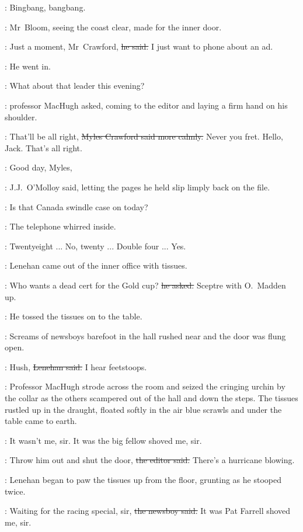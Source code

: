 \BloomInt:
Bingbang, bangbang.

:
Mr~Bloom, seeing the coast clear,
made for the inner door.

\Bloom:
Just a moment, Mr~Crawford,
\sout{he said.}
I just want to phone about an ad.

:
He went in.

\machugh:
What about that leader this evening?

:
professor MacHugh asked,
coming to the editor and laying a firm hand on his shoulder.

\crawford:
That'll be all right,
\sout{Myles Crawford said more calmly.}
Never you fret.
Hello, Jack.
That's all right.

\jjom:
Good day, Myles,

:
J.J.~O'Molloy said,
letting the pages he held slip limply back on the file.

\jjom:
Is that Canada swindle case on today?

:
The telephone whirred inside.

\Bloom:
Twentyeight ...
No, twenty ...
Double four ...
Yes.



:
Lenehan came out of the inner office with  tissues.

\lenehan:
Who wants a dead cert for the Gold cup?
\sout{he asked.}
Sceptre with O.~Madden up.

:
He tossed the tissues on to the table.

:
Screams of newsboys barefoot in the hall rushed near
and the door was flung open.

\lenehan:
Hush,
\sout{Lenehan said.}
I hear feetstoops.

:
Professor MacHugh strode across the room
and seized the cringing urchin by the collar
as the others scampered out of the hall and down the steps.
The tissues rustled up in the draught,
floated softly in the air
blue scrawls
and under the table came to earth.

\boy:
It wasn't me, sir.
It was the big fellow shoved me, sir.

\crawford:
Throw him out and shut the door,
\sout{the editor said.}
There's a hurricane blowing.%

:
Lenehan began to paw the tissues up from the floor,
grunting as he stooped twice.

\boy:
Waiting for the racing special, sir,
\sout{the newsboy said.}
It was Pat Farrell shoved me, sir.

